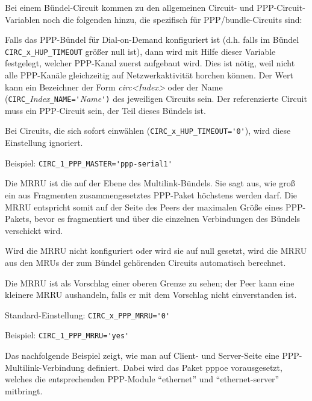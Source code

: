 Bei einem Bündel-Circuit kommen zu den allgemeinen Circuit- und
PPP-Circuit-Variablen noch die folgenden hinzu, die spezifisch für
PPP/bundle-Circuits sind:

\begin{description}


Falls das PPP-Bündel für Dial-on-Demand konfiguriert ist (d.h. falls
im Bündel \verb+CIRC_x_HUP_TIMEOUT+ größer null ist), dann wird mit Hilfe
dieser Variable festgelegt, welcher PPP-Kanal zuerst aufgebaut wird. Dies ist
nötig, weil nicht alle PPP-Kanäle gleichzeitig auf Netzwerkaktivität horchen
können. Der Wert kann ein Bezeichner der Form \emph{circ<Index>} oder der Name
(\verb+CIRC_+\emph{Index}\verb+_NAME='+\emph{Name}\verb+')+ des jeweiligen
Circuits sein. Der referenzierte Circuit muss ein PPP-Circuit sein, der Teil
dieses Bündels ist.

Bei Circuits, die sich sofort einwählen (\verb+CIRC_x_HUP_TIMEOUT='0'+), wird
diese Einstellung ignoriert.

Beispiel: \verb+CIRC_1_PPP_MASTER='ppp-serial1'+


Die MRRU ist die  auf der Ebene des Multilink-Bündels.
Sie sagt aus, wie groß ein aus Fragmenten zusammengesetztes PPP-Paket höchstens
werden darf. Die MRRU entspricht somit auf der Seite des Peers der maximalen
Größe eines PPP-Pakets, bevor es fragmentiert und über die einzelnen
Verbindungen des Bündels verschickt wird.

Wird die MRRU nicht konfiguriert oder wird sie auf null gesetzt, wird die MRRU
aus den MRUs der zum Bündel gehörenden Circuits automatisch berechnet.

Die MRRU ist als Vorschlag einer oberen Grenze zu sehen; der Peer kann eine
kleinere MRRU aushandeln, falls er mit dem Vorschlag nicht einverstanden ist.

Standard-Einstellung: \verb+CIRC_x_PPP_MRRU='0'+

Beispiel: \verb+CIRC_1_PPP_MRRU='yes'+

\end{description}

Das nachfolgende Beispiel zeigt, wie man auf Client- und Server-Seite eine
PPP-Multilink-Verbindung definiert. Dabei wird das Paket pppoe vorausgesetzt,
welches die entsprechenden PPP-Module ``ethernet'' und ``ethernet-server''
mitbringt.

